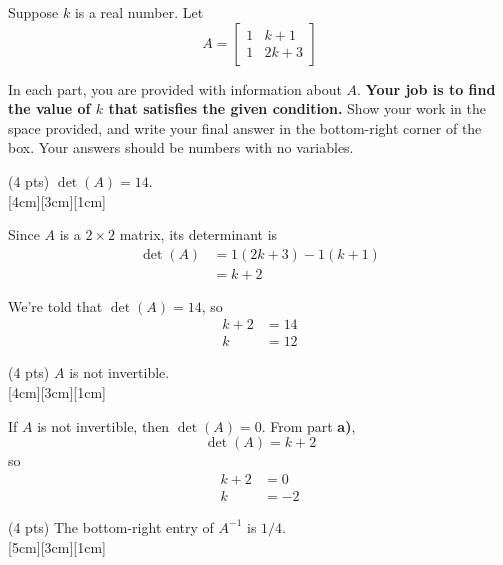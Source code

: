 \documentclass[11pt]{article}
\begin{document}
\begin{prob}[(12 pts)]
Suppose $k$ is a real number. Let
\[
A =
\begin{bmatrix}
1 & k+1 \\
1 & 2k+3
\end{bmatrix}
\]

In each part, you are provided with information about $A$. \textbf{Your job is to find the value of $k$ that satisfies the given condition.} Show your work in the space provided, and write your final answer in the bottom-right corner of the box. Your answers should be numbers with no variables.

\begin{subprob}(4 pts) $\det(A) = 14$. \\

[4cm][3cm][1cm]

\begin{solution}
Since $A$ is a $2 \times 2$ matrix, its determinant is
\begin{align*}
\det(A) &= 1(2k+3) - 1(k+1) \\
&= k + 2
\end{align*}

We're told that $\det(A) = 14$, so
\begin{align*}
k + 2 &= 14 \\
k &= 12
\end{align*}
\end{solution}
\end{subprob}

\begin{subprob}(4 pts) $A$ is not invertible. \\

[4cm][3cm][1cm]

\begin{solution}
If $A$ is not invertible, then $\det(A) = 0$. From part \textbf{a)},
\[
\det(A) = k + 2
\]
so
\begin{align*}
k + 2 &= 0 \\
k &= -2
\end{align*}
\end{solution}
\end{subprob}

\begin{subprob}(4 pts) The bottom-right entry of $A^{-1}$ is $1/4$. \\

[5cm][3cm][1cm]


\end{subprob}
\end{prob}
\end{document}
